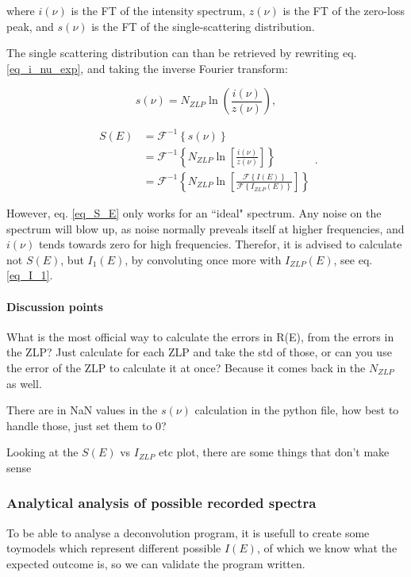 where $i(\nu)$ is the FT of the intensity spectrum, $z(\nu)$ is the FT of the zero-loss peak, and $s(\nu)$ is the FT of the single-scattering distribution.


The single scattering distribution can than be retrieved by rewriting eq. \eqref{eq_i_nu_exp}, and taking the inverse Fourier transform:

\begin{equation}
    s(\nu) = N_{ZLP} \operatorname{ln}\left(\frac{i(\nu)}{z(\nu)}\right),
\end{equation}

\begin{equation}\label{eq_S_E}
    \begin{aligned}
    S(E) &= \mathcal{F}^{-1}\left\{s(\nu)\right\} \\
    &= \mathcal{F}^{-1}\left\{N_{ZLP}\operatorname{ln}\left[\frac{i(\nu)}{z(\nu)}\right]\right\} \\
    &= \mathcal{F}^{-1}\left\{N_{ZLP}\operatorname{ln}\left[\frac{\mathcal{F}\left\{I(E)\right\}}{\mathcal{F}\left\{I_{ZLP}(E)\right\}}\right]\right\}
    \end{aligned}.
\end{equation}


However, eq. \eqref{eq_S_E} only works for an ``ideal" spectrum. Any noise on the spectrum will blow up, as noise normally preveals itself at higher frequencies, and $i(\nu)$ tends towards zero for high frequencies. Therefor, it is advised to calculate not $S(E)$, but $I_1(E)$, by convoluting once more with $I_{ZLP}(E)$, see eq. \eqref{eq_I_1}. \cite{egerton_book}




\paragraph{Discussion points} What is the most official way to calculate the errors in R(E), from the errors in the ZLP? Just calculate for each ZLP and take the std of those, or can you use the error of the ZLP to calculate it at once? Because it comes back in the $N_{ZLP}$ as well.

There are in NaN values in the $s(\nu)$ calculation in the python file, how best to handle those, just set them to 0?

Looking at the $S(E)$ vs $I_{ZLP}$ etc plot, there are some things that don't make sense



\subsubsection{Analytical analysis of possible recorded spectra}
To be able to analyse a deconvolution program, it is usefull to create some toymodels which represent different possible $I(E)$, of which we know what the expected outcome is, so we can validate the program written.



